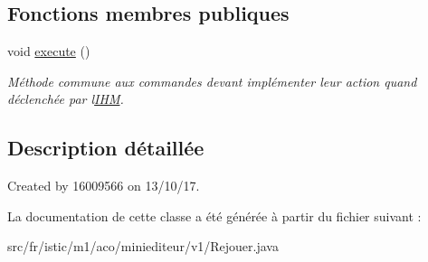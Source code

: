 \subsection*{Fonctions membres publiques}
\begin{DoxyCompactItemize}
\item 
\mbox{\label{classfr_1_1istic_1_1m1_1_1aco_1_1miniediteur_1_1v1_1_1Rejouer_a4c2093ae315b9520fa94a1f058a4d815}} 
void \hyperlink{classfr_1_1istic_1_1m1_1_1aco_1_1miniediteur_1_1v1_1_1Rejouer_a4c2093ae315b9520fa94a1f058a4d815}{execute} ()
\begin{DoxyCompactList}\small\item\em Méthode commune aux commandes devant implémenter leur action quand déclenchée par l\textquotesingle{}\hyperlink{interfacefr_1_1istic_1_1m1_1_1aco_1_1miniediteur_1_1v1_1_1IHM}{I\+HM}. \end{DoxyCompactList}\end{DoxyCompactItemize}


\subsection{Description détaillée}
Created by 16009566 on 13/10/17. 

La documentation de cette classe a été générée à partir du fichier suivant \+:\begin{DoxyCompactItemize}
\item 
src/fr/istic/m1/aco/miniediteur/v1/Rejouer.\+java\end{DoxyCompactItemize}
